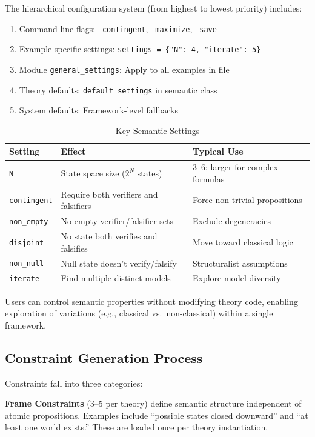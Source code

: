 \documentclass[pdflatex,sn-mathphys-num]{sn-jnl}
\theoremstyle{thmstyleone}
\theoremstyle{thmstyletwo}
\theoremstyle{thmstylethree}
\begin{document}
The hierarchical configuration system (from highest to lowest priority) includes:
\begin{enumerate}
    \item Command-line flags: \texttt{--contingent}, \texttt{--maximize}, \texttt{--save}
    \item Example-specific settings: \texttt{settings = \{"N": 4, "iterate": 5\}}
    \item Module \texttt{general\_settings}: Apply to all examples in file
    \item Theory defaults: \texttt{default\_settings} in semantic class
    \item System defaults: Framework-level fallbacks
\end{enumerate}

\begin{table}[htbp]
\centering
\caption{Key Semantic Settings}
\label{tab:settings}
\begin{tabular}{@{}lll@{}}
\toprule
\textbf{Setting} & \textbf{Effect} & \textbf{Typical Use} \\
\midrule
\texttt{N} & State space size ($2^N$ states) & 3--6; larger for complex formulas \\
\texttt{contingent} & Require both verifiers and falsifiers & Force non-trivial propositions \\
\texttt{non\_empty} & No empty verifier/falsifier sets & Exclude degeneracies \\
\texttt{disjoint} & No state both verifies and falsifies & Move toward classical logic \\
\texttt{non\_null} & Null state doesn't verify/falsify & Structuralist assumptions \\
\texttt{iterate} & Find multiple distinct models & Explore model diversity \\
\bottomrule
\end{tabular}
\end{table}

Users can control semantic properties without modifying theory code, enabling exploration of variations (e.g., classical vs.\ non-classical) within a single framework.

\subsection{Constraint Generation Process}\label{sec:constraints}

Constraints fall into three categories:

\textbf{Frame Constraints} (3--5 per theory) define semantic structure independent of atomic propositions.
Examples include ``possible states closed downward'' and ``at least one world exists.''
These are loaded once per theory instantiation.
\end{document}
